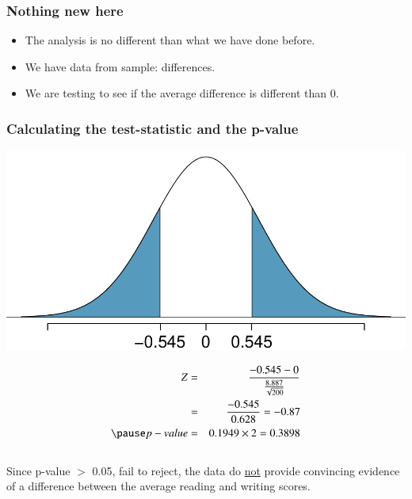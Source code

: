 
\begin{frame}
\frametitle{Nothing new here}

\begin{itemize}

\item The analysis is no different than what we have done before.

\item We have data from  sample: differences. 

\item We are testing to see if the average difference is different than 0.

\end{itemize}

\end{frame}



\begin{frame}[shrink]
\frametitle{Calculating the test-statistic and the p-value}


{
\begin{center}
\includegraphics[width=\textwidth]{5-1_paired/figures/hsb2/hsb2_read_write_pval}
\end{center}
}
{
\pause
\begin{eqnarray*}
Z &=& \frac{-0.545 - 0}{\frac{8.887}{\sqrt{200}}} \\
&=& \frac{-0.545}{0.628} = -0.87 \\
\pause
p-value &=& 0.1949 \times 2 = 0.3898
\end{eqnarray*}
}
\pause 
$\:$ \\
Since p-value $>$ 0.05, fail to reject, the data do \underline{not} provide convincing evidence of a difference between the average reading and writing scores.

\end{frame}


